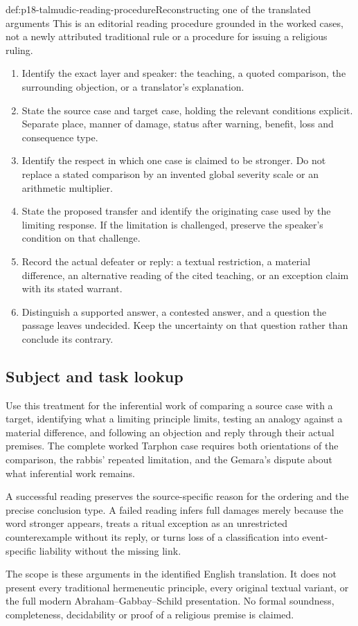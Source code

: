 \begin{hbmethod}{def:p18-talmudic-reading-procedure}{Reconstructing one of the translated arguments}
This is an editorial reading procedure grounded in the worked cases,
not a newly attributed traditional rule or a procedure for issuing
a religious ruling.
\begin{enumerate}
\item Identify the exact layer and speaker: the teaching, a quoted
      comparison, the surrounding objection, or a translator's explanation.
\item State the source case and target case, holding the relevant
      conditions explicit. Separate place, manner of damage, status
      after warning, benefit, loss and consequence type.
\item Identify the respect in which one case is claimed to be stronger.
      Do not replace a stated comparison by an invented global severity
      scale or an arithmetic multiplier.
\item State the proposed transfer and identify the originating case
      used by the limiting response. If the limitation is challenged,
      preserve the speaker's condition on that challenge.
\item Record the actual defeater or reply: a textual restriction,
      a material difference, an alternative reading of the cited
      teaching, or an exception claim with its stated warrant.
\item Distinguish a supported answer, a contested answer, and a question
      the passage leaves undecided. Keep the uncertainty on that
      question rather than conclude its contrary.
\end{enumerate}
\end{hbmethod}

\subsection{Subject and task lookup}
\label{sec:p18-talmudic-lookup}

Use this treatment for the inferential work of comparing a source
case with a target, identifying what a limiting principle limits,
testing an analogy against a material difference, and following
an objection and reply through their actual premises. The complete
worked Tarphon case requires both orientations of the comparison,
the rabbis' repeated limitation, and the Gemara's dispute about
what inferential work remains.

A successful reading preserves the source-specific reason for the
ordering and the precise conclusion type. A failed reading infers
full damages merely because the word stronger appears, treats a
ritual exception as an unrestricted counterexample without its
reply, or turns loss of a classification into event-specific
liability without the missing link.

The scope is these arguments in the identified English translation.
It does not present every traditional hermeneutic principle, every
original textual variant, or the full modern Abraham--Gabbay--Schild
presentation. No formal soundness, completeness, decidability or
proof of a religious premise is claimed.
